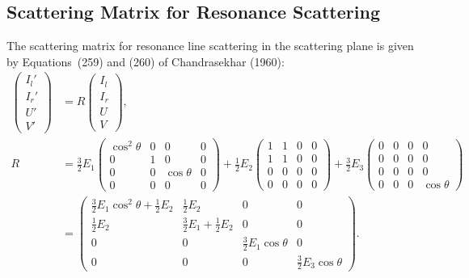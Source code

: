 \documentclass[english,a4paper]{kiseon_memo}
\begin{document}
\subsection{Scattering Matrix for Resonance Scattering}

The scattering matrix for resonance line scattering in the
scattering plane is given by Equations~(259) and (260) of
Chandrasekhar (1960):
\begin{align*}
\left(\begin{array}{c} I_{l}'\\ I_{r}'\\ U'\\ V'\end{array}\right)
& = R\left(\begin{array}{c} I_{l}\\ I_{r}\\ U\\ V\end{array}\right),\\
R & = \frac{3}{2}E_{1}\left(\begin{array}{cccc}
\cos^{2}\theta & 0 & 0 & 0\\
0 & 1 & 0 & 0\\
0 & 0 & \cos\theta & 0\\
0 & 0 & 0 & 0
\end{array}\right)
+\frac{1}{2}E_{2}\left(\begin{array}{cccc}
1 & 1 & 0 & 0\\
1 & 1 & 0 & 0\\
0 & 0 & 0 & 0\\
0 & 0 & 0 & 0
\end{array}\right)
+\frac{3}{2}E_{3}\left(\begin{array}{cccc}
0 & 0 & 0 & 0\\
0 & 0 & 0 & 0\\
0 & 0 & 0 & 0\\
0 & 0 & 0 & \cos\theta
\end{array}\right)\\[2pt]
& = \left(\begin{array}{cccc}
\tfrac{3}{2}E_{1}\cos^{2}\theta+\tfrac{1}{2}E_{2} & \tfrac{1}{2}E_{2} & 0 & 0\\
\tfrac{1}{2}E_{2} & \tfrac{3}{2}E_{1}+\tfrac{1}{2}E_{2} & 0 & 0\\
0 & 0 & \tfrac{3}{2}E_{1}\cos\theta & 0\\
0 & 0 & 0 & \tfrac{3}{2}E_{3}\cos\theta
\end{array}\right).
\end{align*}
\end{document}
